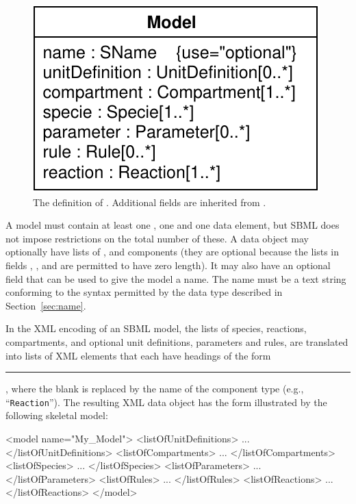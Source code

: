\documentclass[10pt]{cekarticle}
\begin{document}
\begin{figure}[htb]
  \centering
  \includegraphics[scale = 0.68]{model}
  \caption{The definition of .  Additional fields are
    inherited from .}
  \label{fig:model}
\end{figure}

A model must contain at least one , one  and
one  data element, but SBML does not impose restrictions
on the total number of these.  A  data object may optionally
have lists of ,  and 
components (they are optional because the lists in fields
, , and 
are permitted to have zero length).  It may also have an optional
 field that can be used to give the model a name.  The name
must be a text string conforming to the syntax permitted by the
 data type described in Section~\ref{sec:name}.

In the XML encoding of an SBML model, the lists of species, reactions,
compartments, and optional unit definitions, parameters and rules, are
translated into lists of XML elements that each have headings of the form
\rule{0.5in}{0.5pt}, where the blank is replaced by
the name of the component type (e.g., ``\texttt{Reaction}'').  The
resulting XML data object has the form illustrated by the following
skeletal model:

\begin{example}
<model name="My_Model">
    <listOfUnitDefinitions>
        ...
    </listOfUnitDefinitions>
    <listOfCompartments>
        ...
    </listOfCompartments>
    <listOfSpecies>
        ...
    </listOfSpecies>
    <listOfParameters>
        ...
    </listOfParameters>
    <listOfRules>
        ...
    </listOfRules>
    <listOfReactions>
        ...
    </listOfReactions>
</model>
\end{example}
\end{document}
